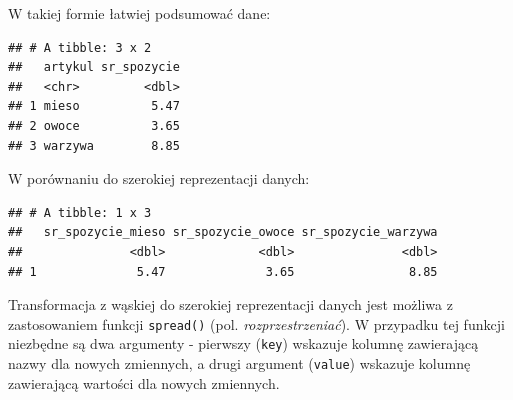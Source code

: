 \documentclass[]{book}
\newenvironment{Shaded}{\begin{snugshade}}{\end{snugshade}}
\newcommand{\KeywordTok}[1]{\textcolor[rgb]{0.13,0.29,0.53}{\textbf{#1}}}
\newcommand{\DataTypeTok}[1]{\textcolor[rgb]{0.13,0.29,0.53}{#1}}
\newcommand{\StringTok}[1]{\textcolor[rgb]{0.31,0.60,0.02}{#1}}
\newcommand{\OperatorTok}[1]{\textcolor[rgb]{0.81,0.36,0.00}{\textbf{#1}}}
\newcommand{\NormalTok}[1]{#1}
\begin{document}
W takiej formie łatwiej podsumować dane:

\begin{Shaded}
\end{Shaded}

\begin{verbatim}
## # A tibble: 3 x 2
##   artykul sr_spozycie
##   <chr>         <dbl>
## 1 mieso          5.47
## 2 owoce          3.65
## 3 warzywa        8.85
\end{verbatim}

W porównaniu do szerokiej reprezentacji danych:

\begin{Shaded}
\end{Shaded}

\begin{verbatim}
## # A tibble: 1 x 3
##   sr_spozycie_mieso sr_spozycie_owoce sr_spozycie_warzywa
##               <dbl>             <dbl>               <dbl>
## 1              5.47              3.65                8.85
\end{verbatim}

Transformacja z wąskiej do szerokiej reprezentacji danych jest możliwa z
zastosowaniem funkcji \texttt{spread()} (pol. \emph{rozprzestrzeniać}).
W przypadku tej funkcji niezbędne są dwa argumenty - pierwszy
(\texttt{key}) wskazuje kolumnę zawierającą nazwy dla nowych zmiennych,
a drugi argument (\texttt{value}) wskazuje kolumnę zawierającą wartości
dla nowych zmiennych.

\begin{Shaded}
\end{Shaded}
\end{document}
